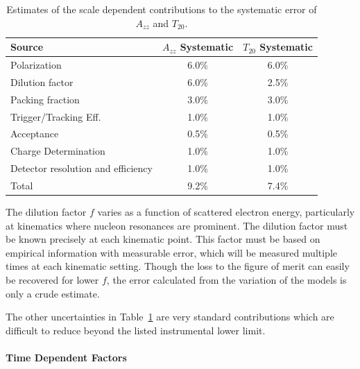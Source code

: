 \begin{table}
\begin{center}
\begin{tabular}{l|c|c}\hline\hline
Source                         & $A_{zz}$ Systematic & $T_{20}$ Systematic\\
\hline
Polarization                 &   6.0\%  & 6.0\% \\
Dilution factor              &   6.0\%  & 2.5\% \\
Packing fraction             &   3.0\%  & 3.0\% \\
Trigger/Tracking Eff.        &   1.0\%  & 1.0\% \\
Acceptance                   &   0.5\%  & 0.5\% \\
Charge Determination          &  1.0\%  & 1.0\% \\
Detector resolution and efficiency & 1.0\% & 1.0\% \\
\hline
Total  &  9.2\%  & 7.4\% \\
\hline
\end{tabular}
\caption{\label{sys-unc}Estimates of the scale dependent contributions to the systematic error of $A_{zz}$ and $T_{20}$.}
\end{center}
\end{table}

The dilution factor $f$ varies as a function of scattered electron energy, particularly at
kinematics where nucleon resonances are prominent.  The dilution factor must be known precisely at each kinematic point.  This factor must be based on empirical information with measurable error, which will be measured multiple times at each kinematic setting.  Though the loss to the figure of merit can easily be recovered for lower
$f$, the error calculated from the variation of the models is only a crude estimate.

The other uncertainties in Table~\ref{sys-unc} are very standard contributions which are difficult to reduce beyond the listed instrumental lower limit.

\paragraph{Time Dependent Factors}\mbox{}
\label{timedep}

